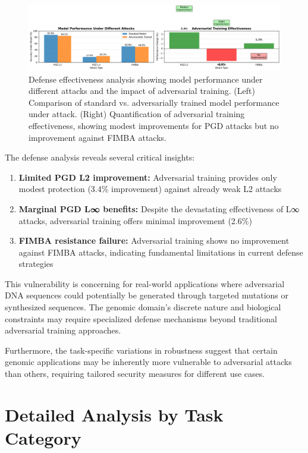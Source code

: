 \documentclass{article} %
\begin{document}
\begin{figure}[h]
\centering
\includegraphics[width=\textwidth]{figures/defense_effectiveness_chart.pdf}
\caption{Defense effectiveness analysis showing model performance under different attacks and the impact of adversarial training. (Left) Comparison of standard vs. adversarially trained model performance under attack. (Right) Quantification of adversarial training effectiveness, showing modest improvements for PGD attacks but no improvement against FIMBA attacks.}
\label{fig:defense_effectiveness}
\end{figure}

The defense analysis reveals several critical insights:

\begin{enumerate}
    \item \textbf{Limited PGD L2 improvement:} Adversarial training provides only modest protection (3.4\% improvement) against already weak L2 attacks
    \item \textbf{Marginal PGD L∞ benefits:} Despite the devastating effectiveness of L∞ attacks, adversarial training offers minimal improvement (2.6\%)
    \item \textbf{FIMBA resistance failure:} Adversarial training shows no improvement against FIMBA attacks, indicating fundamental limitations in current defense strategies
\end{enumerate}

This vulnerability is concerning for real-world applications where adversarial DNA sequences could potentially be generated through targeted mutations or synthesized sequences. The genomic domain's discrete nature and biological constraints may require specialized defense mechanisms beyond traditional adversarial training approaches.

Furthermore, the task-specific variations in robustness suggest that certain genomic applications may be inherently more vulnerable to adversarial attacks than others, requiring tailored security measures for different use cases.

\section{Detailed Analysis by Task Category}
\end{document}

